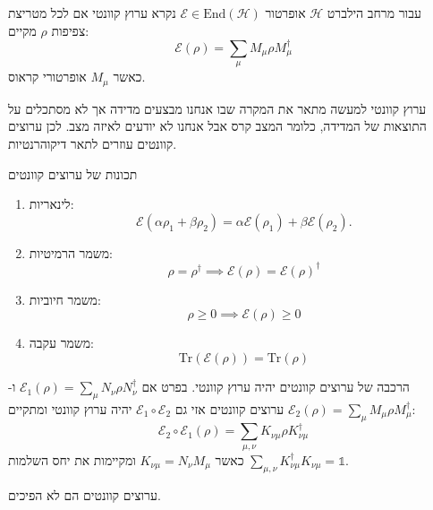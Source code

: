 \documentclass{tstextbook}
\begin{document}
\begin{definition}
עבור מרחב הילברט \(\mathcal{H}\) אופרטור \(\mathcal{E}\in \mathrm{End}\left( \mathcal{H} \right)\) נקרא ערוץ קוונטי אם לכל מטריצת צפיפות \(\rho\) מקיים:
$$\mathcal{E} \left( \rho \right)=\sum_{\mu}M_{\mu}\rho M_{\mu}^{\dagger}$$
כאשר \(M_{\mu}\) אופרטורי קראוס.

\end{definition}
\begin{remark}
ערוץ קוונטי למעשה מתאר את המקרה שבו אנחנו מבצעים מדידה אך לא מסתכלים על התוצאות של המדידה, כלומר המצב קרס אבל אנחנו לא יודעים לאיזה מצב. לכן ערוצים קוונטים עוזרים לתאר דיקוהרנטיות.

\end{remark}
\begin{proposition}
תכונות של ערוצים קוונטים

  \begin{enumerate}
    \item לינאריות: 
$${\mathcal{E}}(\alpha\rho_{1}+\beta\rho_{2})=\alpha{\mathcal{E}}(\rho_{1})+\beta{\mathcal{E}}(\rho_{2}).$$


    \item משמר הרמיטיות: 
$$\rho=\rho ^{\dagger}\implies \mathcal{E} \left( \rho \right)=\mathcal{E} \left( \rho \right)^{\dagger}$$


    \item משמר חיוביות: 
$$\rho \geq 0\implies \mathcal{E} \left( \rho \right)\geq 0$$


    \item משמר עקבה: 
$$\mathrm{Tr}\left( \mathcal{E} \left( \rho \right) \right)=\mathrm{Tr}\left( \rho \right)$$


  \end{enumerate}
\end{proposition}
\begin{proposition}
הרכבה של ערוצים קוונטים יהיה ערוץ קוונטי. בפרט אם \(\mathcal{E}_{1}\left( \rho \right)=\sum_{\mu}N_{\nu}\rho N_{\nu}^{\dagger}\) ו-\({} \mathcal{E}_{2}\left( \rho \right)=\sum_{\mu}M_{\mu}\rho M_{\mu}^{\dagger} {}\) ערוצים קוונטים אזי גם \(\mathcal{E}_{1}\circ\mathcal{E}_{2}\) יהיה ערוץ קוונטי ומתקיים:
$$\mathcal{E} _{2}\circ  \mathcal{E} _{1}\left( \rho \right)=\sum_{\mu,\nu} K_{\nu \mu}\rho K_{\nu \mu}^{\dagger}$$
כאשר \(K_{\nu \mu}=N_{\nu}M_{\mu}\) ומקיימות את יחס השלמות \(\sum_{\mu,\nu}K_{\nu \mu}^{\dagger}K_{\nu \mu}=\mathbb{1}\).

\end{proposition}
\begin{proposition}
ערוצים קוונטים הם לא הפיכים.

\end{proposition}
\end{document}
